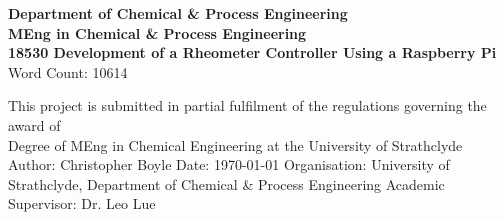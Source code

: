 \documentclass[twoside,a4]{report}
\def\atitle{Development of a Rheometer Controller Using a Raspberry Pi}
\def\thewords{10614} %
\begin{document}
	\begin{titlepage}
		\centering
		\vskip3cm
		{
			\bfseries\Large
			Department of Chemical \& Process Engineering\\
			\vskip1cm
			MEng in Chemical \& Process Engineering\\
			18530
			\vskip3cm
			\LARGE\atitle
		}
		\vskip3cm
		{\small Word Count: \thewords}
		\vskip1cm
		\begin{flushleft}
			This project is submitted in partial fulfilment of the regulations governing the award of \\
			Degree of MEng in Chemical Engineering at the University of Strathclyde
			\vskip2cm
			Author: Christopher Boyle \hfill Date: \today \newline
			\vskip1cm
			Organisation: University of Strathclyde, Department of Chemical \& Process Engineering \newline
			Academic Supervisor: Dr. Leo Lue
		\end{flushleft}
	\end{titlepage}
\end{document}
